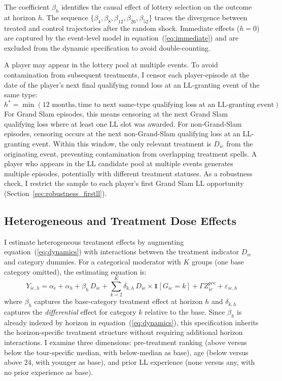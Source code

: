 The coefficient $\beta_h$ identifies the causal effect of lottery selection on the outcome at horizon $h$. The sequence $\{\beta_4, \beta_8, \beta_{12}, \beta_{26}, \beta_{52}\}$ traces the divergence between treated and control trajectories after the random shock. Immediate effects ($h = 0$) are captured by the event-level model in equation~(\ref{eq:immediate}) and are excluded from the dynamic specification to avoid double-counting.

A player may appear in the lottery pool at multiple events. To avoid contamination from subsequent treatments, I censor each player-episode at the date of the player's next final qualifying round loss at an LL-granting event of the same type:
\[
h^{*} = \min(12\text{ months}, \text{time to next same-type qualifying loss at an LL-granting event})
\]
For Grand Slam episodes, this means censoring at the next Grand Slam qualifying loss where at least one LL slot was awarded. For non-Grand-Slam episodes, censoring occurs at the next non-Grand-Slam qualifying loss at an LL-granting event. Within this window, the only relevant treatment is $D_{ie}$ from the originating event, preventing contamination from overlapping treatment spells. A player who appears in the LL candidate pool at multiple events generates multiple episodes, potentially with different treatment statuses. As a robustness check, I restrict the sample to each player's first Grand Slam LL opportunity (Section~\ref{sec:robustness_firstll}).

\subsection{Heterogeneous and Treatment Dose Effects}
\label{sec:strategy_heterogeneity}

I estimate heterogeneous treatment effects by augmenting equation~(\ref{eq:dynamics}) with interactions between the treatment indicator $D_{ie}$ and category dummies. For a categorical moderator with $K$ groups (one base category omitted), the estimating equation is:
\begin{equation}
\label{eq:hetero}
Y_{ie,h} = \alpha_e + \alpha_h + \beta_h \, D_{ie} + \sum_{k=2}^{K} \delta_{k,h} \, D_{ie} \times \mathbf{1}[G_{ie} = k] + \Gamma Z^{pre}_{ie} + \varepsilon_{ie,h}
\end{equation}
where $\beta_h$ captures the base-category treatment effect at horizon $h$ and $\delta_{k,h}$ captures the \textit{differential} effect for category $k$ relative to the base. Since $\beta_h$ is already indexed by horizon in equation~(\ref{eq:dynamics}), this specification inherits the horizon-specific treatment structure without requiring additional horizon interactions. I examine three dimensions: pre-treatment ranking (above versus below the tour-specific median, with below-median as base), age (below versus above 24, with younger as base), and prior LL experience (none versus any, with no prior experience as base).

